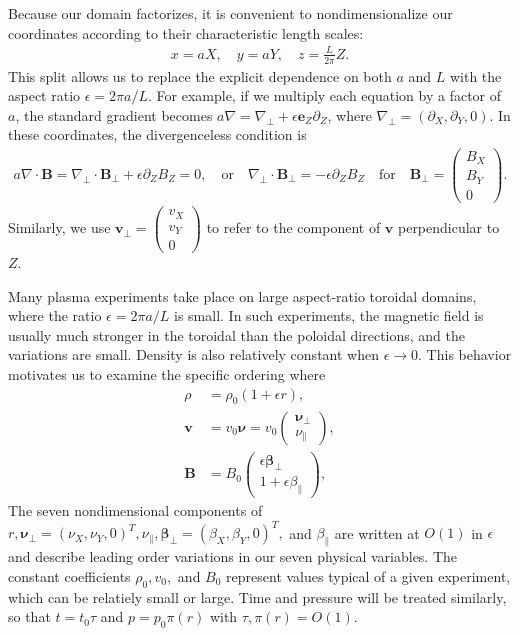 \documentclass{article}
\newcommand{\para}{\parallel}
\newcommand{\ep}{\epsilon}
\newcommand{\np}{\nabla_\perp}
\newcommand{\p}{\partial}
\newcommand{\pth} [1] {\left( #1 \right) }
\newcommand{\pmat} [1] {\begin{pmatrix} #1 \end{pmatrix}}
\begin{document}
Because our domain factorizes, it is convenient to nondimensionalize our coordinates according to their characteristic length scales: 
\begin{align*}
    x=aX,\quad y=aY,\quad z=\frac{L}{2\pi}Z.
\end{align*}
This split allows us to replace the explicit dependence on both $a$ and $L$ with the aspect ratio $\ep = 2\pi a/L$. For example, if we multiply each equation by a factor of $a$, the standard gradient becomes $a\nabla = \np + \ep\bm{e}_Z\p_Z$, where $\np = \pth{\p_X, \p_Y, 0}$. In these coordinates, the divergenceless condition is    
\begin{align}
    a\nabla\cdot\bm{B} = \np\cdot\bm{B}_\perp + \ep\p_Z B_Z = 0, \quad\text{or}\quad \np\cdot\bm{B}_\perp = -\ep\p_ZB_Z \quad\text{for}\quad \bm{B}_\perp = \pmat{B_X \\ B_Y \\ 0}.
\end{align}
Similarly, we use $\bm{v}_\perp = \pmat{v_X \\ v_Y \\ 0}$ to refer to the component of $\bm{v}$ perpendicular to $Z$. 

Many plasma experiments take place on large aspect-ratio toroidal domains, where the ratio $\ep = 2\pi a/L$ is small. In such experiments, the magnetic field is usually much stronger in the toroidal than the poloidal directions, and the variations are small. Density is also relatively constant when $\ep\to 0$. This behavior motivates us to examine the specific ordering where 
\begin{align}
    \rho &= \rho_0 \pth{1+\ep r}, \nonumber\\
    \bm{v} &= v_0\bm{\nu} = v_0 \pmat{\bm{\nu}_\perp \\ \nu_\para}, \\ 
    \bm{B} &= B_0 \pmat{\ep\bm{\beta}_\perp \\ 1 + \ep \beta_\para}, \nonumber
\end{align}
The seven nondimensional components of $r, \bm{\nu}_\perp = \pth{\nu_X, \nu_Y, 0}^T, \nu_\para, \bm{\beta}_\perp = \pth{\beta_X, \beta_Y, 0}^T,$ and $\beta_\para$ are written at $O\pth{1}$ in $\ep$ and describe leading order variations in our seven physical variables. The constant coefficients $\rho_0, v_0,$ and $B_0$ represent values typical of a given experiment, which can be relatiely small or large. Time and pressure will be treated similarly, so that $t=t_0\tau$ and $p=p_0\pi(r)$ with $\tau,\pi(r) = O(1)$.
\end{document}
